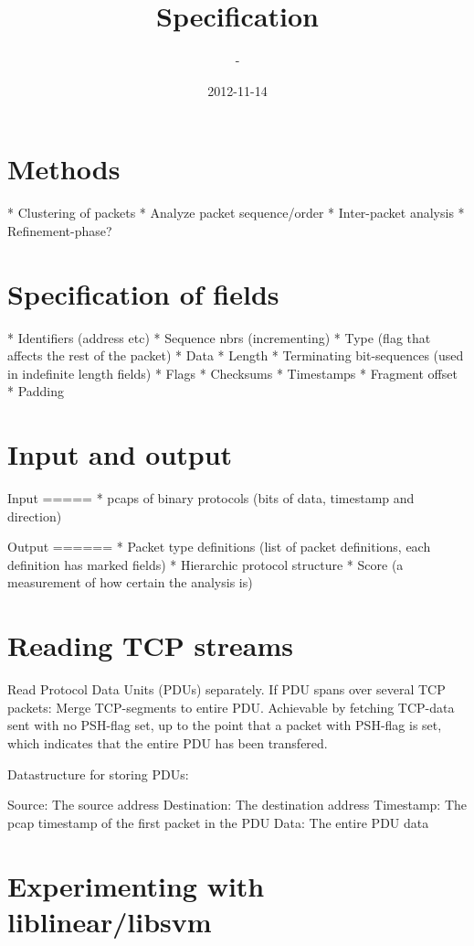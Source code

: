 \documentclass[]{article}
\title{Specification}
\author{-}
\date{2012-11-14}
\begin{document}
\ifpdf
{}
\else
{}
\fi

\clearpage

\section{Methods}

* Clustering of packets
* Analyze packet sequence/order
* Inter-packet analysis
* Refinement-phase?


\section{Specification of fields}

* Identifiers (address etc)
* Sequence nbrs (incrementing)
* Type (flag that affects the rest of the packet)
* Data
* Length
* Terminating bit-sequences (used in indefinite length fields)
* Flags
* Checksums
* Timestamps
* Fragment offset
* Padding

\section{Input and output}

Input
=====
* pcaps of binary protocols (bits of data, timestamp and direction)

Output
======
* Packet type definitions (list of packet definitions, each definition has marked fields)
* Hierarchic protocol structure
* Score (a measurement of how certain the analysis is)
    

\section{Reading TCP streams}

Read Protocol Data Units (PDUs) separately. If PDU spans over several TCP packets:
Merge TCP-segments to entire PDU. Achievable by fetching TCP-data sent with no
PSH-flag set, up to the point that a packet with PSH-flag is set, which indicates
that the entire PDU has been transfered.


Datastructure for storing PDUs:

Source: The source address
Destination: The destination address
Timestamp: The pcap timestamp of the first packet in the PDU
Data: The entire PDU data

\section{Experimenting with liblinear/libsvm}
\end{document}
